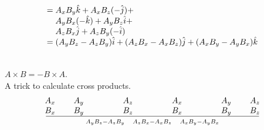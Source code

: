 \begin{itemize}
\[\begin{array}{r@{}l}
                     ={} & A_xB_y\hat{k}+A_xB_z(-\hat{j})+ \\
                         & A_yB_x(-\hat{k})+A_yB_z\hat{i}+ \\
                         & A_zB_x\hat{j}+A_zB_y(-\hat{i}) \\
                     ={} & (A_yB_z-A_zB_y)\hat{i}+(A_zB_x-A_xB_z)\hat{j}+(A_xB_y-A_yB_x)\hat{k}
          \end{array}
        \]
        \begin{figure}[H]
            \centering
        \end{figure}
        \begin{note}\leavevmode\\
          $A\times B=-B\times A$.\\
          A trick to calculate cross products.
          \[
          \begin{array}{c*{4}{wc{5em}}c}
          \tikzmark{1}{A_x} & \tikzmark{2}{A_y} & \tikzmark{3}{A_z} & \tikzmark{4}{A_x} & \tikzmark{5}{A_y} & \tikzmark{6}{A_z} \\
          \tikzmark{7}{B_x} & \tikzmark{8}{B_y} & \tikzmark{9}{B_z} & \tikzmark{10}{B_x} & \tikzmark{11}{B_y} & \tikzmark{12}{B_z} \\
          \hline
          & \multicolumn{4}{c}{\scriptstyle A_yB_z-A_zB_y\quad A_zB_x-A_xB_z\quad A_xB_y-A_yB_x} &
          \end{array}
          \]
        \end{note}
\end{itemize}